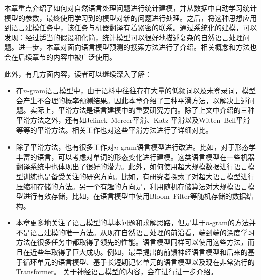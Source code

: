 \parinterval 本章重点介绍了如何对自然语言处理问题进行统计建模，并从数据中自动学习统计模型的参数，最终使用学习到的模型对新的问题进行处理。之后，将这种思想应用到语言建模任务中，该任务与机器翻译有着紧密的联系。通过系统化的建模，可以发现：经过适当的假设和化简，统计模型可以很好地描述复杂的自然语言处理问题。进一步，本章对面向语言模型预测的搜索方法进行了介绍。相关概念和方法也会在后续章节的内容中被广泛使用。

\parinterval 此外，有几方面内容，读者可以继续深入了解：

\begin{adjustwidth}{1em}{}
\begin{itemize}
\vspace{0.5em}
\item 在$n$-gram语言模型中，由于语料中往往存在大量的低频词以及未登录词，模型会产生不合理的概率预测结果。因此本章介绍了三种平滑方法，以解决上述问题。实际上，平滑方法是语言建模中的重要研究方向。除了上文中介绍的三种平滑方法之外，还有如Jelinek–Mercer平滑、Katz 平滑以及Witten–Bell平滑等等的平滑方法。相关工作也对这些平滑方法进行了详细对比。
\vspace{0.5em}
\item 除了平滑方法，也有很多工作对$n$-gram语言模型进行改进。比如，对于形态学丰富的语言，可以考虑对单词的形态变化进行建模。这类语言模型在一些机器翻译系统中也体现出了很好的潜力。此外，如何使用超大规模数据进行语言模型训练也是备受关注的研究方向。比如，有研究者探索了对超大语言模型进行压缩和存储的方法。另一个有趣的方向是，利用随机存储算法对大规模语言模型进行有效存储，比如，在语言模型中使用Bloom\ Filter等随机存储的数据结构。
\vspace{0.5em}
\item 本章更多地关注了语言模型的基本问题和求解思路，但是基于$n$-gram的方法并不是语言建模的唯一方法。从现在自然语言处理的前沿看，端到端的深度学习方法在很多任务中都取得了领先的性能。语言模型同样可以使用这些方法，而且在近些年取得了巨大成功。例如，最早提出的前馈神经语言模型和后来的基于循环单元的语言模型、基于长短期记忆单元的语言模型以及现在非常流行的Transformer。 关于神经语言模型的内容，会在{\chapternine}进行进一步介绍。
\vspace{0.5em}

\end{itemize}
\end{adjustwidth}
